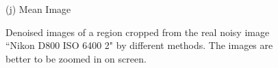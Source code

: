 \documentclass[10pt,onecolumn,letterpaper]{article}
\begin{document}
\begin{figure}
{\begin{minipage}[t]{0.195\textwidth}
{\footnotesize (j) Mean Image \cite{crosschannel2016}}
\end{minipage}
}
\caption{Denoised images of a region cropped from the real noisy image ``Nikon D800 ISO 6400 2" \cite{crosschannel2016} by different methods. The images are better to be zoomed in on screen.}
\label{fig5}
\end{figure}





\clearpage
{
\small


}
\end{document}
